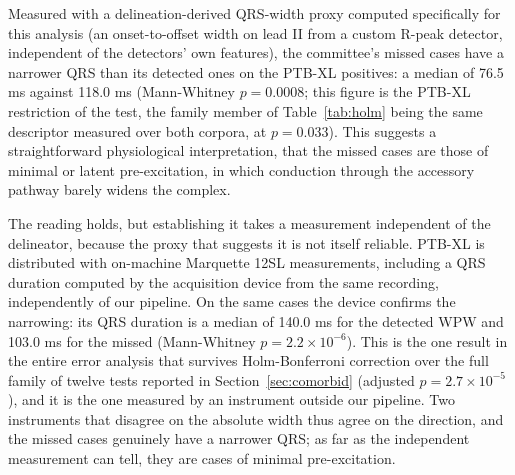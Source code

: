 \documentclass[11pt]{article}
\begin{document}
Measured with a delineation-derived QRS-width proxy computed specifically for this analysis (an onset-to-offset width on lead II from a custom R-peak detector, independent of the detectors' own features), the committee's missed cases have a narrower QRS than its detected ones on the PTB-XL positives: a median of 76.5 ms against 118.0 ms (Mann-Whitney $p = 0.0008$; this figure is the PTB-XL restriction of the test, the family member of Table~\ref{tab:holm} being the same descriptor measured over both corpora, at $p = 0.033$). This suggests a straightforward physiological interpretation, that the missed cases are those of minimal or latent pre-excitation, in which conduction through the accessory pathway barely widens the complex.

The reading holds, but establishing it takes a measurement independent of the delineator, because the proxy that suggests it is not itself reliable. PTB-XL is distributed with on-machine Marquette 12SL measurements, including a QRS duration computed by the acquisition device from the same recording, independently of our pipeline. On the same cases the device confirms the narrowing: its QRS duration is a median of 140.0 ms for the detected WPW and 103.0 ms for the missed (Mann-Whitney $p = 2.2\times10^{-6}$). This is the one result in the entire error analysis that survives Holm-Bonferroni correction over the full family of twelve tests reported in Section~\ref{sec:comorbid} (adjusted $p = 2.7\times10^{-5}$), and it is the one measured by an instrument outside our pipeline. Two instruments that disagree on the absolute width thus agree on the direction, and the missed cases genuinely have a narrower QRS; as far as the independent measurement can tell, they are cases of minimal pre-excitation.
\end{document}
